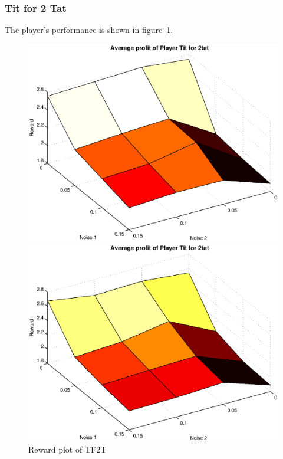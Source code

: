 \subsubsection{Tit for 2 Tat}
The player's performance is shown in figure~\ref{pic player tf2t}.\\
\begin{figure}[h]
	\caption{Reward plot of TF2T}
	\label{pic player tf2t}
\begin{minipage}[hbt]{0.65\textwidth}
	\centering
	\includegraphics[width=\textwidth]{pics/simulation1/Reward_vs_Noise_of_Player_Tit_for_2tat}
\end{minipage}
\hfill
\begin{minipage}[hbt]{0.3\textwidth}
	\centering
	\includegraphics[width=\textwidth]{pics/simulation2/Reward_vs_Noise_of_Player_Tit_for_2tat}
\end{minipage}

\end{figure}

